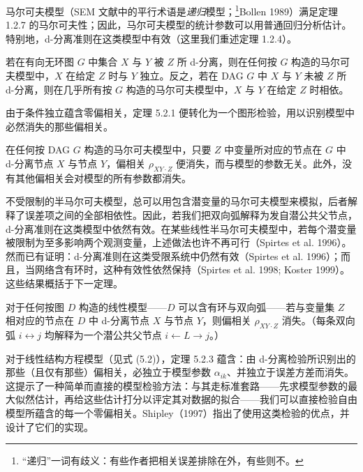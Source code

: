 马尔可夫模型（SEM 文献中的平行术语是\emph{递归}模型；\footnote{“递归”一词有歧义：有些作者把相关误差排除在外，有些则不。}Bollen 1989）满足定理 1.2.7 的马尔可夫性；因此，马尔可夫模型的统计参数可以用普通回归分析估计。特别地，d-分离准则在这类模型中有效（这里我们重述定理 1.2.4）。

\begin{theorem}
若在有向无环图 $G$ 中集合 $X$ 与 $Y$ 被 $Z$ 所 d-分离，则在任何按 $G$ 构造的马尔可夫模型中，$X$ 在给定 $Z$ 时与 $Y$ 独立。反之，若在 DAG $G$ 中 $X$ 与 $Y$ 未被 $Z$ 所 d-分离，则在几乎所有按 $G$ 构造的马尔可夫模型中，$X$ 与 $Y$ 在给定 $Z$ 时相依。
\end{theorem}

由于条件独立蕴含零偏相关，定理 5.2.1 便转化为一个图形检验，用以识别模型中必然消失的那些偏相关。

\begin{corollary}
在任何按 DAG $G$ 构造的马尔可夫模型中，只要 $Z$ 中变量所对应的节点在 $G$ 中 d-分离节点 $X$ 与节点 $Y$，偏相关 $\rho_{XY\cdot Z}$ 便消失，而与模型的参数无关。此外，没有其他偏相关会对模型的所有参数都消失。
\end{corollary}

不受限制的半马尔可夫模型，总可以用包含潜变量的马尔可夫模型来模拟，后者解释了误差项之间的全部相依性。因此，若我们把双向弧解释为发自潜公共父节点，d-分离准则在这类模型中依然有效。在某些线性半马尔可夫模型中，若每个潜变量被限制为至多影响两个观测变量，上述做法也许不再可行（Spirtes et al. 1996）。然而已有证明：d-分离准则在这类受限系统中仍然有效（Spirtes et al. 1996）；而且，当网络含有环时，这种有效性依然保持（Spirtes et al. 1998; Koster 1999）。这些结果概括于下一定理。

\begin{theorem}[一般线性模型中的 d-分离]
对于任何按图 $D$ 构造的线性模型——$D$ 可以含有环与双向弧——若与变量集 $Z$ 相对应的节点在 $D$ 中 d-分离节点 $X$ 与节点 $Y$，则偏相关 $\rho_{XY\cdot Z}$ 消失。（每条双向弧 $i\longleftrightarrow j$ 均解释为一个潜公共父节点 $i\leftarrow L\rightarrow j$。）
\end{theorem}

对于线性结构方程模型（见式 \textup{(5.2)}），定理 5.2.3 蕴含：由 d-分离检验所识别出的那些（且仅有那些）偏相关，必独立于模型参数 $\alpha_{ik}$、并独立于误差方差而消失。这提示了一种简单而直接的模型检验方法：与其走标准套路——先求模型参数的最大似然估计，再给这些估计打分以评定其对数据的拟合——我们可以直接检验自由模型所蕴含的每一个零偏相关。Shipley（1997）指出了使用这类检验的优点，并设计了它们的实现。


